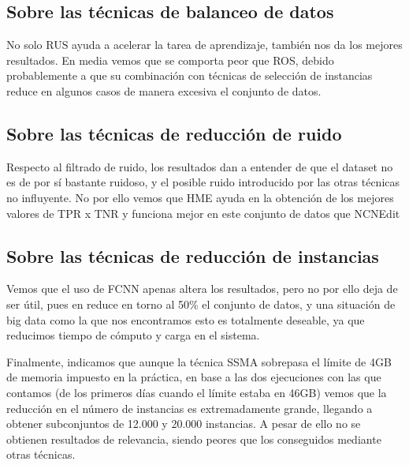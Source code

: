 \subsection{Sobre las técnicas de balanceo de datos}

No solo RUS ayuda a acelerar la tarea de aprendizaje, también nos da los mejores resultados. En media vemos que se comporta peor que ROS, debido probablemente a que su combinación con técnicas de selección de instancias reduce en algunos casos de manera excesiva el conjunto de datos.

\subsection{Sobre las técnicas de reducción de ruido}

Respecto al filtrado de ruido, los resultados dan a entender de que el dataset no es de por sí bastante ruidoso, y el posible ruido introducido por las otras técnicas no influyente. No por ello vemos que HME ayuda en la obtención de los mejores valores de TPR x TNR y funciona mejor en este conjunto de datos que NCNEdit

\subsection{Sobre las técnicas de reducción de instancias}

Vemos que el uso de FCNN apenas altera los resultados, pero no por ello deja de ser útil, pues en reduce en torno al 50\% el conjunto de datos, y una situación de big data como la que nos encontramos esto es totalmente deseable, ya que reducimos tiempo de cómputo y carga en el sistema.

Finalmente, indicamos que aunque la técnica SSMA sobrepasa el límite de 4GB de memoria impuesto en la práctica, en base a las dos ejecuciones con las que contamos (de los primeros días cuando el límite estaba en 46GB) vemos que la reducción en el número de instancias es extremadamente grande, llegando a obtener subconjuntos de 12.000 y 20.000 instancias.
A pesar de ello no se obtienen resultados de relevancia, siendo peores que los conseguidos mediante otras técnicas.

